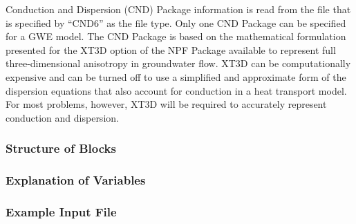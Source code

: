 Conduction and Dispersion (CND) Package information is read from the file that is specified by ``CND6'' as the file type.  Only one CND Package can be specified for a GWE model.  The CND Package is based on the mathematical formulation presented for the XT3D option of the NPF Package available to represent full three-dimensional anisotropy in groundwater flow.  XT3D can be computationally expensive and can be turned off to use a simplified and approximate form of the dispersion equations that also account for conduction in a heat transport model.  For most problems, however, XT3D will be required to accurately represent conduction and dispersion. 

\vspace{5mm}
\subsubsection{Structure of Blocks}



\vspace{5mm}
\subsubsection{Explanation of Variables}
\begin{description}

\end{description}

\vspace{5mm}
\subsubsection{Example Input File}


